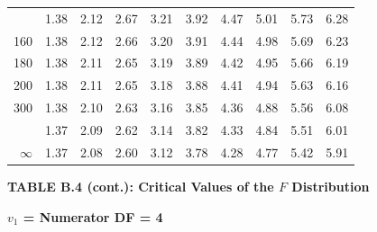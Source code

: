 \documentclass[10pt]{article}
\begin{document}
\begin{longtable}{@{}r!{\vrule width 0.8pt\hspace{0.55em}}rrrrrrrrr@{}}
 & 1.38 & 2.12 & 2.67 & 3.21 & 3.92 & 4.47 & 5.01 & 5.73 & 6.28 \\
160 & 1.38 & 2.12 & 2.66 & 3.20 & 3.91 & 4.44 & 4.98 & 5.69 & 6.23 \\
180 & 1.38 & 2.11 & 2.65 & 3.19 & 3.89 & 4.42 & 4.95 & 5.66 & 6.19 \\
200 & 1.38 & 2.11 & 2.65 & 3.18 & 3.88 & 4.41 & 4.94 & 5.63 & 6.16 \\
300 & 1.38 & 2.10 & 2.63 & 3.16 & 3.85 & 4.36 & 4.88 & 5.56 & 6.08 \\
 & 1.37 & 2.09 & 2.62 & 3.14 & 3.82 & 4.33 & 4.84 & 5.51 & 6.01 \\
$\infty$ & 1.37 & 2.08 & 2.60 & 3.12 & 3.78 & 4.28 & 4.77 & 5.42 & 5.91 \\
\end{longtable}
\newpage
\thispagestyle{empty}
\begin{center}
{\large\bfseries TABLE B.4 (cont.): Critical Values of the $F$ Distribution\par}
\end{center}
{\large\bfseries $v_1$ = Numerator DF = 4\par}
\vspace{0.5em}
\small
\end{document}
